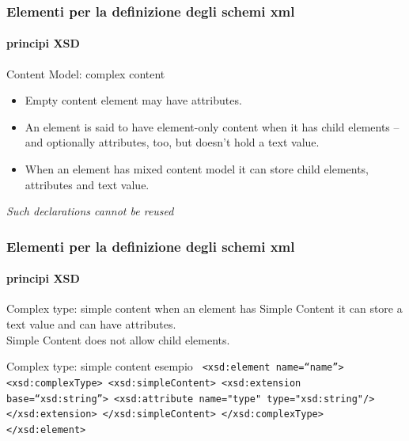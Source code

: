 \begin{frame}
	\frametitle{Elementi per la definizione degli schemi xml}
	\framesubtitle{principi XSD}
	\addtocounter{nframe}{1}

	\begin{block}{Content Model: complex content}
		\begin{itemize}
			\item Empty content element may have attributes.
			\item An element is said to have element-only content when it has child elements – and optionally attributes, too, but doesn't hold a text value.
			\item When an element has mixed content model it can store child elements, attributes and text value.
		\end{itemize}
	\end{block}
	\textit{Such declarations cannot be reused}
\end{frame}





\begin{frame}
	\frametitle{Elementi per la definizione degli schemi xml}
	\framesubtitle{principi XSD}
	\addtocounter{nframe}{1}

	\begin{block}{Complex type: simple content}
		when an element has Simple Content it can store a text value and can have attributes.
		\\Simple Content does not allow child elements.
	\end{block}

	\begin{block}{Complex type: simple content esempio}
		\texttt{
			<xsd:element name=``name''>
				<xsd:complexType>
				<xsd:simpleContent>
					<xsd:extension base=``xsd:string''>
					<xsd:attribute name="type" type="xsd:string"/>
					</xsd:extension>
				</xsd:simpleContent>
				</xsd:complexType>
			</xsd:element>
		}
	\end{block}
\end{frame}


